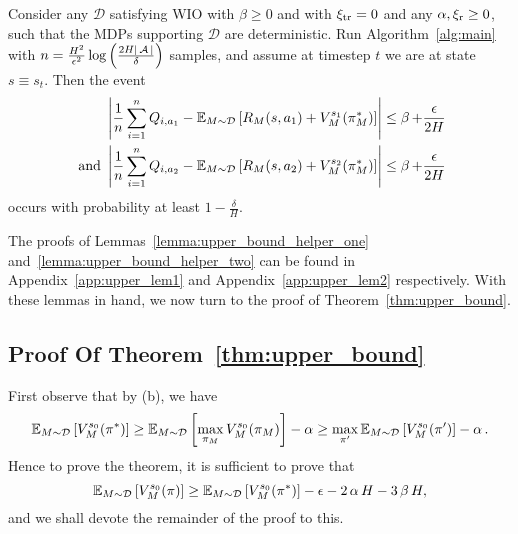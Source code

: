 \documentclass[11pt,twoside]{article}
\begin{document}
\begin{lemma}
\label{lemma:upper_bound_helper_two}
Consider any $\mathcal{D}$ satisfying WIO with $\beta \geq 0$ and \strprox{} with $\operatorname{\xi_{tr}} = 0$ and any $\operatorname{\alpha}, \operatorname{\xi_r} \geq 0$, such that the MDPs supporting $\mathcal{D}$ are deterministic. Run Algorithm~\ref{alg:main} with $n = \frac{H^2}{\epsilon^2} \log \left( \frac{2 H \vert \operatorname{\mathcal{A}} \vert}{\delta} \right)$ samples, and assume at timestep $t$ we are at state $s \equiv s_t$. Then the event
\begin{equation*}
\begin{split}
&\left \vert \frac{1}{n} \sum_{i=1}^n Q_{i, a_1} - \operatorname{\mathbb{E}}_{M \sim \mathcal{D}} \left[ R_M(s, a_1) + V^{{s_1 }}_{{M }}({\pi^*_M}) \right] \right \vert \leq \operatorname{\beta} + \frac{\epsilon}{2H} \\
\text{ and } &\left \vert \frac{1}{n} \sum_{i=1}^n Q_{i, a_2} - \operatorname{\mathbb{E}}_{M \sim \mathcal{D}} \left[ R_M(s, a_2) + V^{{s_2 }}_{{M }}({\pi^*_M}) \right] \right \vert \leq \operatorname{\beta} + \frac{\epsilon}{2H}
\end{split}
\end{equation*}
occurs with probability at least $1 - \frac{\delta}{H}$.
\end{lemma}

\noindent The proofs of Lemmas~\ref{lemma:upper_bound_helper_one} and~\ref{lemma:upper_bound_helper_two} can be found in Appendix~\ref{app:upper_lem1} and Appendix~\ref{app:upper_lem2} respectively. With these lemmas in hand, we now turn to the proof of Theorem~\ref{thm:upper_bound}.

\subsection{Proof Of Theorem~\ref{thm:upper_bound}}
\label{app:upper_thm_proof}
\noindent First observe that by \strprox{} (b), we have
$$
\operatorname{\mathbb{E}}_{M \sim \mathcal{D}} \left[ V^{{s_0 }}_{{M }}({\pi^*}) \right] \geq \operatorname{\mathbb{E}}_{M \sim \mathcal{D}} \left[ \max_{\pi_M} V^{{s_0 }}_{{M }}({\pi_M}) \right] - \operatorname{\alpha} \geq \max_{\pi'} \operatorname{\mathbb{E}}_{M \sim \mathcal{D}} \left[ V^{{s_0 }}_{{M }}({\pi'}) \right] - \operatorname{\alpha}.
$$
Hence to prove the theorem, it is sufficient to prove that
$$
\operatorname{\mathbb{E}}_{M \sim \mathcal{D}} \left[ V^{{s_0 }}_{{M }}({\pi}) \right] \geq \operatorname{\mathbb{E}}_{M \sim \mathcal{D}} \left[ V^{{s_0 }}_{{M }}({\pi^*}) \right] - \epsilon - 2 \operatorname{\alpha} H - 3 \operatorname{\beta} H,
$$
and we shall devote the remainder of the proof to this. \\
\end{document}
